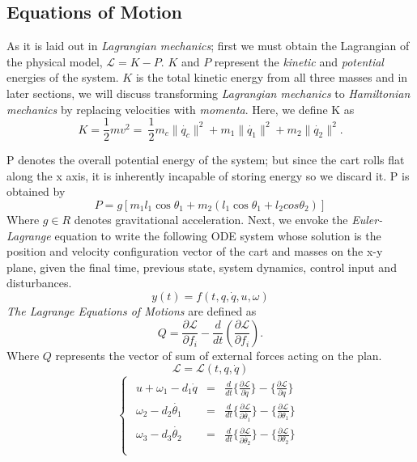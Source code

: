 \documentclass[journal]{IEEEtran}
\begin{document}
\subsection{Equations of Motion}
As it is laid out in \emph{Lagrangian mechanics}; first we must obtain the Lagrangian
of the physical model, \(\mathcal{L}= K -P\). \(K\) and \(P\) represent the
\emph{kinetic} and \emph{potential} energies of the system. \(K\) is the total
kinetic energy from all three masses and in later sections, we will discuss
transforming \emph{Lagrangian mechanics} to \emph{Hamiltonian mechanics} by
replacing velocities with \emph{momenta}. Here, we define K as
\begin{equation}
    K = \frac{1}{2} m v^2 =~ \frac{1}{2} {m_c\|\dot{q_c}\|^2 + m_1\|\dot{q_1}\|^2 + m_2\|\dot{q_2}\|^2}.
\end{equation}

P denotes the overall potential energy of the system; but since the cart rolls
flat along the x axis, it is inherently incapable of storing energy so we discard
it. P is obtained by
\begin{equation}
    P = g \left[ m_1 l_1 \cos \theta_1 + m_2 (l_1 \cos \theta_1 + l_2 cos \theta_2) \right]
\end{equation}
Where \(g \in R\) denotes gravitational acceleration.
Next, we envoke the \emph{Euler-Lagrange} equation to write the following ODE system
whose solution is the position and velocity configuration vector of the cart
and masses on the x-y plane, given the final time, previous state, system
dynamics, control input and disturbances.
\begin{equation}
    y(t) = f(t,q,\dot{q},u,\omega)
\end{equation}
\emph{The Lagrange Equations of Motions} are defined as
\begin{equation}
    Q = \frac{\partial\mathcal{L}}{\partial f_{i}} - \frac{d}{dt} \left( \frac{\partial \mathcal{L}}{\partial f_{i}}\right).
\end{equation}
Where \(Q\) represents the vector of sum of external forces acting on the plan.
\begin{equation}
    \mathcal{L} = \mathcal{L}(t, q, \dot{q})
\end{equation}
\begin{equation}
\begin{cases}
\begin{array}{rcl}
    u + \omega_1 -d_1 \dot{q} &=& \frac{d}{dt} \{\frac{\partial\mathcal{L}}{\partial\dot{q}}\}-\{\frac{\partial\mathcal{L}}{\partial q}\}\\
    \omega_2 -d_2 \dot{\theta_1} &=& \frac{d}{dt} \{\frac{\partial\mathcal{L}}{\partial\dot{\theta_1}}\}-\{\frac{\partial\mathcal{L}}{\partial \theta_1}\}\\
    \omega_3 -d_3 \dot{\theta_2} &=& \frac{d}{dt} \{\frac{\partial\mathcal{L}}{\partial\dot{\theta_2}}\}-\{\frac{\partial\mathcal{L}}{\partial \theta_2}\}\\
    \end{array}
\end{cases}
\end{equation}
\end{document}
